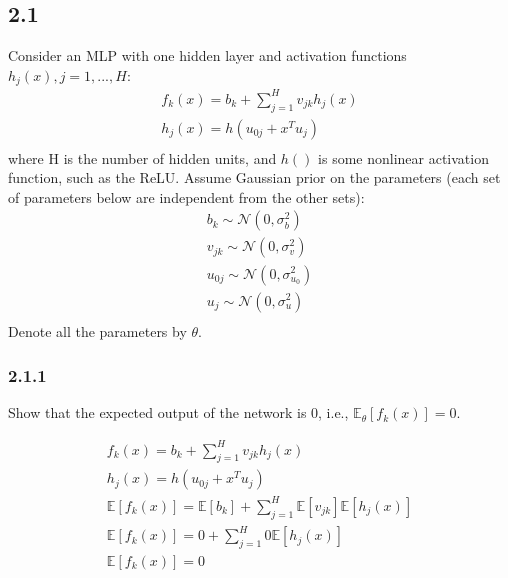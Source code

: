 \documentclass[12pt]{article}
\begin{document}
\subsection{2.1}
Consider an MLP with one hidden layer and activation functions $h_j(x), j = 1, . . . , H$:
\begin{gather*}
    f_k(x) = b_k + \sum_{j=1}^{H} v_{jk} h_j(x) \\
    h_j(x) = h(u_{0j} + x^T u_j) \\
\end{gather*}
where H is the number of hidden units, and $h()$ is some nonlinear activation function, such
as the ReLU. Assume Gaussian prior on the parameters (each set of parameters below are
independent from the other sets):
\begin{gather*}
    b_k \sim \mathcal{N}(0,\sigma_b^2) \\
    v_{jk} \sim \mathcal{N}(0,\sigma_v^2) \\
    u_{0j} \sim \mathcal{N}(0,\sigma_{u_0}^2) \\
    u_j \sim \mathcal{N}(0,\sigma_u^2) \\
\end{gather*}
Denote all the parameters by $\theta$.
\subsubsection{2.1.1}
Show that the expected output of the network is 0, i.e., $\mathbb{E}_\theta[f_k(x)] = 0$.
\begin{qsolve}
    \begin{gather*}
        f_k(x) = b_k + \sum_{j=1}^{H} v_{jk} h_j(x) \\
        h_j(x) = h(u_{0j} + x^T u_j) \\
        \mathbb{E}[f_k(x)] = \mathbb{E}[b_k] + \sum_{j=1}^{H} \mathbb{E}[v_{jk}] \mathbb{E}[h_j(x)] \\
        \mathbb{E}[f_k(x)] = 0 + \sum_{j=1}^{H} 0 \mathbb{E}[h_j(x)] \\
        \mathbb{E}[f_k(x)] = 0 \\
    \end{gather*}
\end{qsolve}
\end{document}
